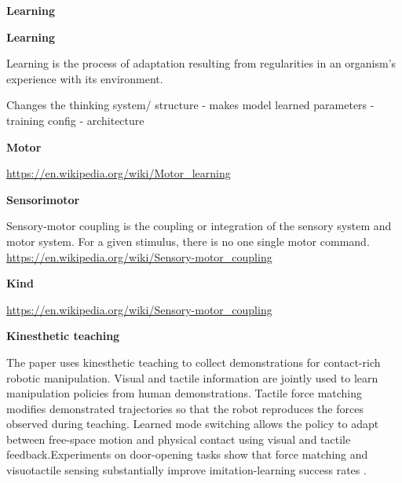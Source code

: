 \documentclass{book}
\providecommand{\ProjectDeepHeading}[2]{%
    \par\medskip\noindent\textbf{#2}\par\smallskip
}
\begin{document}
\ProjectDeepHeading{4}{Learning}


\ProjectDeepHeading{10}{Learning}

               \cite{de-houwer-2013-what-is-learning-on-the-nature-and-merits-of-a-functional-definition-of-learning}
               Learning is the process of adaptation resulting from regularities in an organism's experience with its environment.

               Changes the thinking system/ structure
               - makes model learned parameters
               - training config
               - architecture

\ProjectDeepHeading{5}{Motor}


\url{https://en.wikipedia.org/wiki/Motor_learning}

\ProjectDeepHeading{5}{Sensorimotor}


Sensory-motor coupling is the coupling or integration of the sensory system and motor system. For a given stimulus, there is no one single motor command. \url{https://en.wikipedia.org/wiki/Sensory-motor_coupling}

\ProjectDeepHeading{6}{Kind}


\url{https://en.wikipedia.org/wiki/Sensory-motor_coupling}

\ProjectDeepHeading{7}{Kinesthetic teaching}


The paper uses kinesthetic teaching to collect demonstrations for contact-rich robotic manipulation.
    Visual and tactile information are jointly used to learn manipulation policies from human demonstrations.
    Tactile force matching modifies demonstrated trajectories so that the robot reproduces the forces observed during teaching. Learned mode switching allows the policy to adapt between free-space motion and physical contact using visual and tactile feedback.Experiments on door-opening tasks show that force matching and visuotactile sensing substantially improve imitation-learning success rates \cite{ablett-2025-multimodal-and-force-matched-imitation-learning-with-a-see-through-visuotactile-sensor}.
\end{document}
